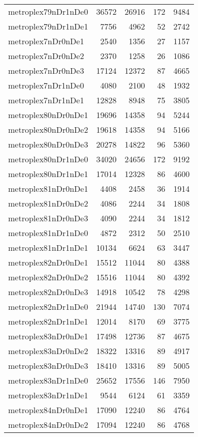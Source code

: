 \begin{tabular}{lrrrr}
metroplex79nDr1nDe0 & 36572 & 26916 & 172 & 9484 \\
metroplex79nDr1nDe1 & 7756 & 4962 & 52 & 2742 \\
metroplex7nDr0nDe1 & 2540 & 1356 & 27 & 1157 \\
metroplex7nDr0nDe2 & 2370 & 1258 & 26 & 1086 \\
metroplex7nDr0nDe3 & 17124 & 12372 & 87 & 4665 \\
metroplex7nDr1nDe0 & 4080 & 2100 & 48 & 1932 \\
metroplex7nDr1nDe1 & 12828 & 8948 & 75 & 3805 \\
metroplex80nDr0nDe1 & 19696 & 14358 & 94 & 5244 \\
metroplex80nDr0nDe2 & 19618 & 14358 & 94 & 5166 \\
metroplex80nDr0nDe3 & 20278 & 14822 & 96 & 5360 \\
metroplex80nDr1nDe0 & 34020 & 24656 & 172 & 9192 \\
metroplex80nDr1nDe1 & 17014 & 12328 & 86 & 4600 \\
metroplex81nDr0nDe1 & 4408 & 2458 & 36 & 1914 \\
metroplex81nDr0nDe2 & 4086 & 2244 & 34 & 1808 \\
metroplex81nDr0nDe3 & 4090 & 2244 & 34 & 1812 \\
metroplex81nDr1nDe0 & 4872 & 2312 & 50 & 2510 \\
metroplex81nDr1nDe1 & 10134 & 6624 & 63 & 3447 \\
metroplex82nDr0nDe1 & 15512 & 11044 & 80 & 4388 \\
metroplex82nDr0nDe2 & 15516 & 11044 & 80 & 4392 \\
metroplex82nDr0nDe3 & 14918 & 10542 & 78 & 4298 \\
metroplex82nDr1nDe0 & 21944 & 14740 & 130 & 7074 \\
metroplex82nDr1nDe1 & 12014 & 8170 & 69 & 3775 \\
metroplex83nDr0nDe1 & 17498 & 12736 & 87 & 4675 \\
metroplex83nDr0nDe2 & 18322 & 13316 & 89 & 4917 \\
metroplex83nDr0nDe3 & 18410 & 13316 & 89 & 5005 \\
metroplex83nDr1nDe0 & 25652 & 17556 & 146 & 7950 \\
metroplex83nDr1nDe1 & 9544 & 6124 & 61 & 3359 \\
metroplex84nDr0nDe1 & 17090 & 12240 & 86 & 4764 \\
metroplex84nDr0nDe2 & 17094 & 12240 & 86 & 4768 \\

\end{tabular}
